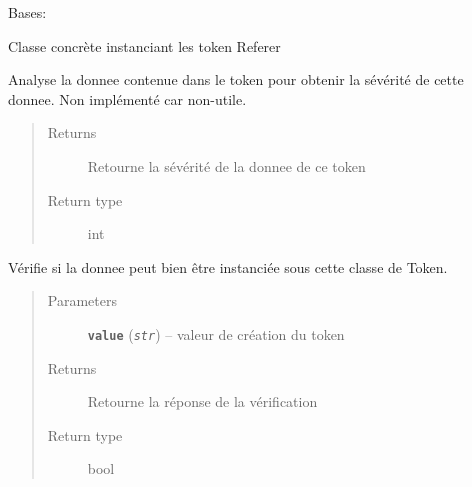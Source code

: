 \documentclass[letterpaper,10pt,english]{sphinxmanual}
\begin{document}

\begin{fulllineitems}
\label{loganalyser:loganalyser.token.Referer}
Bases: {\hyperref[loganalyser:loganalyser.token.Token]{\emph{}}}

Classe concrète instanciant les token Referer

\begin{fulllineitems}
\label{loganalyser:loganalyser.token.Referer._Token__analyse}
Analyse la donnee contenue dans le token pour obtenir la sévérité de cette donnee. Non implémenté car non-utile.
\begin{quote}\begin{description}
\item[{Returns}] \leavevmode
Retourne la sévérité de la donnee de ce token

\item[{Return type}] \leavevmode
int

\end{description}\end{quote}

\end{fulllineitems}


\begin{fulllineitems}
\label{loganalyser:loganalyser.token.Referer._Token__verifier_type}
Vérifie si la donnee peut bien être instanciée sous cette classe de Token.
\begin{quote}\begin{description}
\item[{Parameters}] \leavevmode
\textbf{\texttt{value}} (\emph{\texttt{str}}) -- valeur de création du token

\item[{Returns}] \leavevmode
Retourne la réponse de la vérification

\item[{Return type}] \leavevmode
bool

\end{description}\end{quote}

\end{fulllineitems}


\end{fulllineitems}
\end{document}
